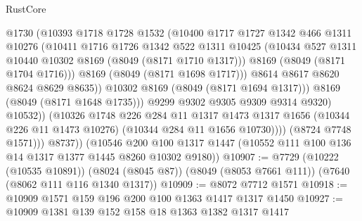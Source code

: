 \begin{lexlean}{RustCore}
\begin{coremodule}
                            @1730
                            (@10393
                              @1718
                              @1728
                              @1532
                              (@10400
                                @1717
                                @1727
                                @1342
                                @466
                                @1311
                                @10276
                                (@10411
                                  @1716
                                  @1726
                                  @1342
                                  @522
                                  @1311
                                  @10425
                                  (@10434
                                    @527
                                    @1311
                                    @10440
                                    @10302
                                    @8169
                                    (@8049 (@8171 @1710 @1317)))
                                  @8169
                                  (@8049 (@8171 @1704 @1716)))
                                @8169
                                (@8049 (@8171 @1698 @1717)))
                              @8614
                              @8617
                              @8620
                              @8624
                              @8629
                              @8635))
                          @10302
                          @8169
                          (@8049 (@8171 @1694 @1317)))
                        @8169
                        (@8049 (@8171 @1648 @1735)))
                      @9299
                      @9302
                      @9305
                      @9309
                      @9314
                      @9320)
                    @10532))
                (@10326
                  @1748
                  @226
                  @284
                  @11
                  @1317
                  @1473
                  @1317
                  @1656
                  (@10344 @226 @11 @1473 @10276)
                  (@10344 @284 @11 @1656 @10730))))
            (@8724 @7748 @1571)))
        @8737))
    (@10546 @200 @100 @1317 @1447 (@10552 @111 @100 @136 @14 @1317 @1377 @1445 @8260 @10302 @9180))
@10907 := @7729
    (@10222 (@10535 @10891))
    (@8024 (@8045 @87))
    (@8049 (@8053 @7661 @111))
    (@7640 (@8062 @111 @116 @1340 @1317))
@10909 := @8072 @7712 @1571
@10918 := @10909 @1571 @159 @196 @200 @100 @1363 @1417 @1317 @1450
@10927 := @10909 @1381 @139 @152 @158 @18 @1363 @1382 @1317 @1417

\end{coremodule}
\end{lexlean}
